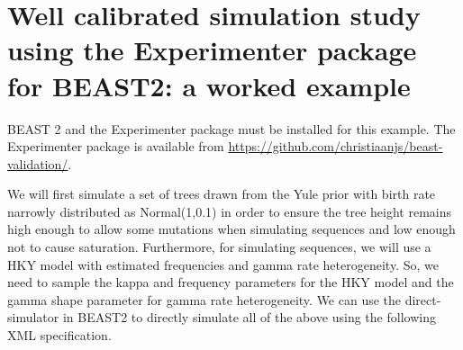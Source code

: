 \documentclass[oneside]{article}
\begin{document}
\newpage

\lstset{language=XML}
\section{Well calibrated simulation study using the Experimenter package for BEAST2: a worked example}

BEAST 2 and the Experimenter package must be installed for this example.
The Experimenter package is available from \url{https://github.com/christiaanjs/beast-validation/}.

We will first simulate a set of trees drawn from the Yule prior with birth rate narrowly distributed as Normal(1,0.1) in order to ensure the tree height remains high enough to allow some mutations when simulating sequences and low enough not to cause saturation.
Furthermore, for simulating sequences, we will use a HKY model with estimated frequencies and gamma rate heterogeneity. 
So, we need to sample the kappa and frequency parameters for the HKY model and the gamma shape parameter for gamma rate heterogeneity.
We can use the direct-simulator in BEAST2 to directly simulate all of the above using the following XML specification.
\end{document}
